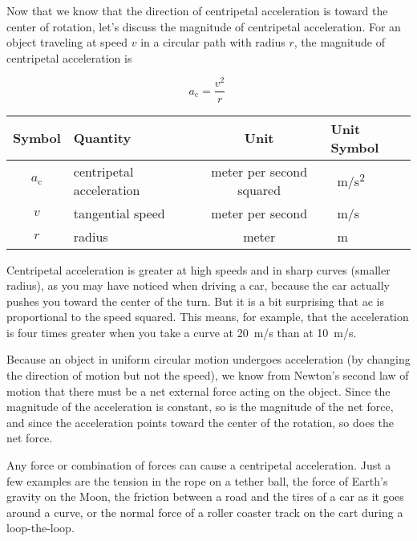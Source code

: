\documentclass[main.tex]{subfiles}
\begin{document}
\vspace{1em}

Now that we know that the direction of centripetal acceleration is toward the center of rotation, let's discuss the magnitude of centripetal acceleration. For an object traveling at speed $v$ in a circular path with radius $r$, the magnitude of centripetal acceleration is


\begin{equation} \label{5vsZ8y}
    a_{\text{c}} = \frac{v^2}{r}\ 
\end{equation}

\begin{center}
    \begin{tabular}{cl|cl}
    \hline
    \textbf{Symbol} & \textbf{Quantity} & \textbf{Unit} & \textbf{Unit Symbol}  \\
    \hline\hline
    \rule{0pt}{2.5ex}
        $a_{\text{c}}$ & centripetal acceleration & meter per second squared & \SI{}{m/s^2}\\
        $v$ & tangential speed & meter per second & \SI{}{m/s} \\
        $r$ & radius & meter & \SI{}{m}\\
    \hline
    \end{tabular}
\end{center}

Centripetal acceleration is greater at high speeds and in sharp curves (smaller radius), as you may have noticed when driving a car, because the car actually pushes you toward the center of the turn. But it is a bit surprising that ac is proportional to the speed squared. This means, for example, that the acceleration is four times greater when you take a curve at \SI{20}{m/s} than at \SI{10}{m/s}.

\vspace{1em}

Because an object in uniform circular motion undergoes acceleration (by changing the direction of motion but not the speed), we know from Newton's second law of motion that there must be a net external force acting on the object. Since the magnitude of the acceleration is constant, so is the magnitude of the net force, and since the acceleration points toward the center of the rotation, so does the net force.

\vspace{1em}

Any force or combination of forces can cause a centripetal acceleration. Just a few examples are the tension in the rope on a tether ball, the force of Earth's gravity on the Moon, the friction between a road and the tires of a car as it goes around a curve, or the normal force of a roller coaster track on the cart during a loop-the-loop.
\end{document}
